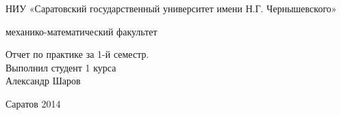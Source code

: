 \documentclass[11pt]{article}
\title{}
\author{Александр Шаров}
\date{}
\begin{document}
  \begin{center}
    \large

    \vspace{0.5cm}
НИУ «Саратовский государственный университет имени Н.Г. Чернышевского»

    \vspace{0.25cm}
    
    механико-математический факультет

    \vfill
    {\LARGE Отчет по практике за 1-й семестр.\\Выполнил студент 1 курса \\Александр Шаров}

    \vfill



  \bigskip
    
    Саратов 2014
\end{center}
\end{document}
